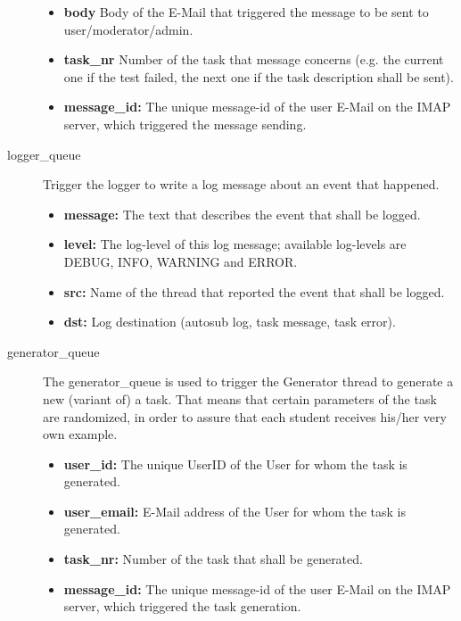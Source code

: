 \begin{description}
\begin{itemize}
\begin{itemize}
            \end{itemize}

        \item{\bf body} Body of the E-Mail that triggered the message to be sent to user/moderator/admin.
        \item {\bf task\_nr} Number of the task that message concerns (e.g. the current
            one if the test failed, the next one if the task description shall be sent).
        \item {\bf message\_id:} The unique message-id of the user E-Mail on the IMAP server,
            which triggered the message sending.
    \end{itemize}

\item [logger\_queue] Trigger the logger to write a log message about an event that happened.
    \begin{itemize}
        \item {\bf message:} The text that describes the event that shall be logged.
        \item {\bf level:} The log-level of this log message; available log-levels
            are DEBUG, INFO, WARNING and ERROR.
        \item {\bf src:} Name of the thread that reported the event that shall be logged.
        \item {\bf dst:} Log destination (autosub log, task message, task error).
    \end{itemize}

\item [generator\_queue] The generator\_queue is used to trigger the Generator thread
    to generate a new (variant of) a task. That means that certain parameters of the
    task are randomized, in order to assure that each student receives his/her very
    own example.
    \begin{itemize}
        \item {\bf user\_id:} The unique UserID of the User for whom the task is generated.
        \item {\bf user\_email:} E-Mail address of the User for whom the task is generated.
        \item {\bf task\_nr:} Number of the task that shall be generated.
        \item {\bf message\_id:} The unique message-id of the user E-Mail on the IMAP server,
            which triggered the task generation.
    \end{itemize}


\end{description}
